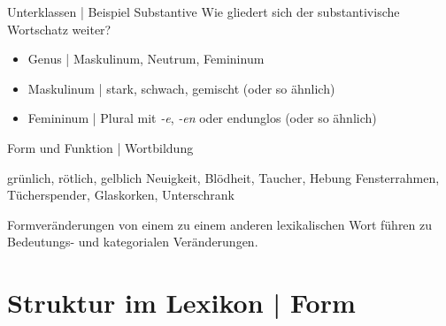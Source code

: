 \begin{frame}
  {Unterklassen | Beispiel Substantive}
  \onslide<+->
  Wie gliedert sich der substantivische Wortschatz weiter?
  \onslide<+->
  \Zeile
  \begin{itemize}[<+->]
    \item \alert{Genus} | Maskulinum, Neutrum, Femininum
    \item Maskulinum | \alert{stark}, \alert{schwach}, \alert{gemischt} (oder so ähnlich)
    \item Femininum | Plural mit \textit{-e}, \textit{-en} oder endunglos (oder so ähnlich) 
  \end{itemize}
\end{frame}

\begin{frame}
  {Form und Funktion | Wortbildung}
  \pause
  \begin{exe}
    \ex grün\alert{lich}, röt\alert{lich}, gelb\alert{lich}
    \pause
    \ex Neu\alert{igkeit}, Blöd\alert{heit}, Tauch\alert{er}, Heb\alert{ung}
    \pause
    \ex Fenster\alert{rahmen}, Tücher\alert{spender}, Glas\alert{korken}, Unter\alert{schrank}
  \end{exe}
  \pause
  \Zeile
  Formveränderungen von einem zu einem anderen lexikalischen Wort führen zu Bedeutungs- und kategorialen Veränderungen.
\end{frame}


\section{Struktur im Lexikon | Form}

